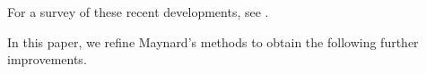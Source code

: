 \documentclass{bmcart}
\theoremstyle{plain}
\theoremstyle{definition}
\begin{document}
For a survey of these recent developments, see \cite{granville}.  

In this paper, we refine Maynard's methods to obtain the following further improvements.
\end{document}
